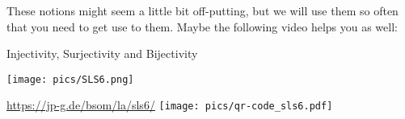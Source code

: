 These notions might seem a little bit off-putting, but we will use them so often that you need to get use to them. Maybe the following video
helps you as well:

\begin{Video}{Injectivity{,} Surjectivity and Bijectivity}
	\begin{minipage}{0.5\linewidth}
		\begin{center}
			\texttt{[image: pics/SLS6.png]}
		\end{center}
	\end{minipage}
	\begin{minipage}{0.5\linewidth}
		\begin{center}
			\url{https://jp-g.de/bsom/la/sls6/}
			\texttt{[image: pics/qr-code\_sls6.pdf]}
		\end{center}
	\end{minipage}
\end{Video}